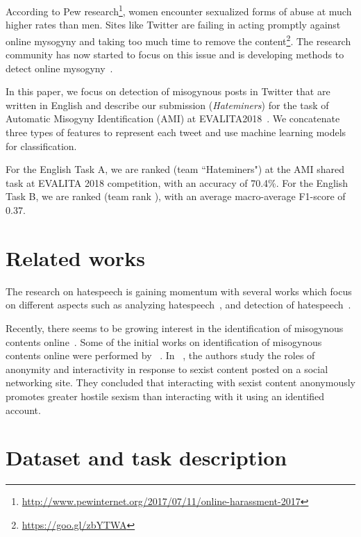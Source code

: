 \documentclass[11pt]{article}
\begin{document}
According to Pew research\footnote{\url{http://www.pewinternet.org/2017/07/11/online-harassment-2017}}, women encounter sexualized forms of abuse at much higher rates than men. Sites like Twitter are failing in acting promptly against online mysogyny and taking too much time to remove the content\footnote{\url{https://goo.gl/zbYTWA}}. The research community has now started to focus on this issue and is developing methods to detect online mysogyny~\cite{hewitt2016problem,fersini2018overview,poland2016haters}.


In this paper, we focus on detection of misogynous posts in Twitter that are written in English and describe our submission (\textit{Hateminers}) for the task of Automatic Misogyny Identification (AMI) at EVALITA2018~\cite{fersini2018overviewEvalita}. We concatenate three types of features to represent each tweet and use machine learning models for classification.

For the English Task  A,  we are ranked  (team  ``Hateminers")  at  the  AMI shared task at EVALITA  2018 competition,  with  an  accuracy  of  70.4\%.  For  the English Task  B,  we are ranked  (team rank ), with an average macro-average F1-score of 0.37.




\section{Related works}

The research on hatespeech is gaining momentum with several works which focus on different aspects such as analyzing hatespeech~\cite{ElSherief2018PeerTP,mathew2018spread,silva2016analyzing,chandrasekharan2017you,grondahl2018all}, and detection of hatespeech~\cite{fortuna2018survey,davidson2017automated,qian2018hierarchical}. 

Recently, there seems to be growing interest in the identification of misogynous contents online~\cite{ging2018special}. Some of the initial works on identification of misogynous contents online were performed by ~\cite{Hewitt:2016:PIM:2908131.2908183}. 
In ~\cite{fox2015perpetuating}, the authors study the roles of anonymity and interactivity in response to sexist content posted on a social networking site. They concluded that interacting with sexist content anonymously promotes greater hostile sexism than interacting with it using an identified account.


\section{Dataset and task description}
\end{document}

